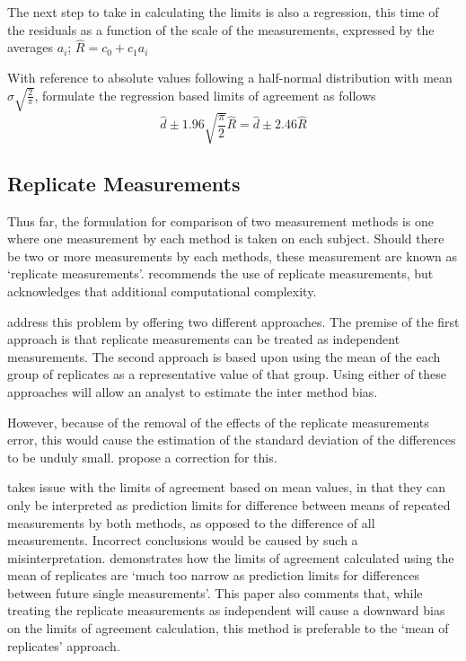 \documentclass[12pt, a4paper]{report}
\begin{document}
The next step to take in calculating the limits is also a
regression, this time of the residuals as a function of the scale
of the measurements, expressed by the averages $a_{i}$;
 $ \hat{R} = c_{0}+ c_{1}a_{i}$

With reference to absolute values following a half-normal
distribution with mean $\sigma\sqrt{\frac{2}{\pi}}$, \citet{BA99} formulate the regression based limits of agreement as
follows
 \begin{equation}
  \hat{d} \pm 1.96\sqrt{\frac{\pi}{2}}\hat{R} = \hat{d} \pm 2.46\hat{R}
 \end{equation}

\subsection{Replicate Measurements}

Thus far, the formulation for comparison of two measurement
methods is one where one measurement by each method is taken on
each subject. Should there be two or more measurements by each
methods, these measurement are known as `replicate measurements'.
\citet{BXC2008} recommends the use of replicate measurements, but
acknowledges that  additional computational complexity.

\citet*{BA86} address this problem by offering two different
approaches. The premise of the first approach is that replicate
measurements can be treated as independent measurements. The
second approach is based upon using the mean of the each group of
replicates as a representative value of that group. Using either
of these approaches will allow an analyst to estimate the inter
method bias.


However, because of the removal of the effects of the replicate
measurements error, this would cause the estimation of the
standard deviation of the differences to be unduly small.
\citet*{BA86} propose a correction for this.

\citet{BXC2008} takes issue with the limits of agreement based on
mean values, in that they can only be interpreted as prediction
limits for difference between means of repeated measurements by
both methods, as opposed to the difference of all measurements.
Incorrect conclusions would be caused by such a misinterpretation.
\citet{BXC2008} demonstrates how the limits of agreement
calculated using the mean of replicates are `much too narrow as
prediction limits for differences between future single
measurements'. This paper also comments that, while treating the
replicate measurements as independent will cause a downward bias
on the limits of agreement calculation, this method is preferable
to the `mean of replicates' approach.
\end{document}
